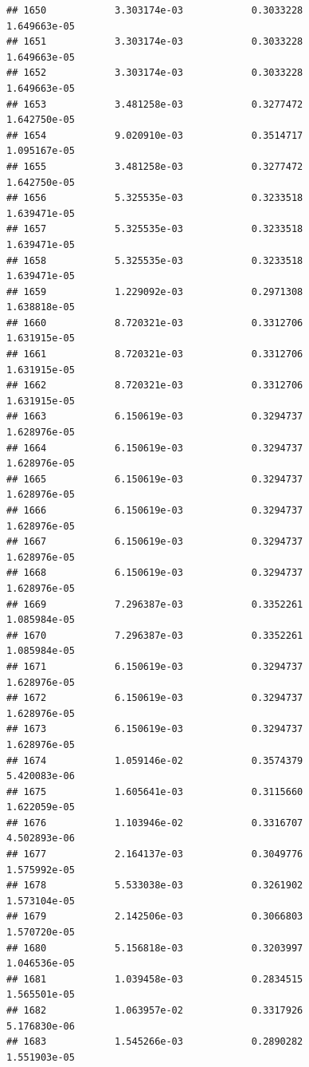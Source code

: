 \documentclass[
]{article}
\begin{document}
\begin{verbatim}
## 1650            3.303174e-03            0.3033228            1.649663e-05
## 1651            3.303174e-03            0.3033228            1.649663e-05
## 1652            3.303174e-03            0.3033228            1.649663e-05
## 1653            3.481258e-03            0.3277472            1.642750e-05
## 1654            9.020910e-03            0.3514717            1.095167e-05
## 1655            3.481258e-03            0.3277472            1.642750e-05
## 1656            5.325535e-03            0.3233518            1.639471e-05
## 1657            5.325535e-03            0.3233518            1.639471e-05
## 1658            5.325535e-03            0.3233518            1.639471e-05
## 1659            1.229092e-03            0.2971308            1.638818e-05
## 1660            8.720321e-03            0.3312706            1.631915e-05
## 1661            8.720321e-03            0.3312706            1.631915e-05
## 1662            8.720321e-03            0.3312706            1.631915e-05
## 1663            6.150619e-03            0.3294737            1.628976e-05
## 1664            6.150619e-03            0.3294737            1.628976e-05
## 1665            6.150619e-03            0.3294737            1.628976e-05
## 1666            6.150619e-03            0.3294737            1.628976e-05
## 1667            6.150619e-03            0.3294737            1.628976e-05
## 1668            6.150619e-03            0.3294737            1.628976e-05
## 1669            7.296387e-03            0.3352261            1.085984e-05
## 1670            7.296387e-03            0.3352261            1.085984e-05
## 1671            6.150619e-03            0.3294737            1.628976e-05
## 1672            6.150619e-03            0.3294737            1.628976e-05
## 1673            6.150619e-03            0.3294737            1.628976e-05
## 1674            1.059146e-02            0.3574379            5.420083e-06
## 1675            1.605641e-03            0.3115660            1.622059e-05
## 1676            1.103946e-02            0.3316707            4.502893e-06
## 1677            2.164137e-03            0.3049776            1.575992e-05
## 1678            5.533038e-03            0.3261902            1.573104e-05
## 1679            2.142506e-03            0.3066803            1.570720e-05
## 1680            5.156818e-03            0.3203997            1.046536e-05
## 1681            1.039458e-03            0.2834515            1.565501e-05
## 1682            1.063957e-02            0.3317926            5.176830e-06
## 1683            1.545266e-03            0.2890282            1.551903e-05

\end{verbatim}
\end{document}
